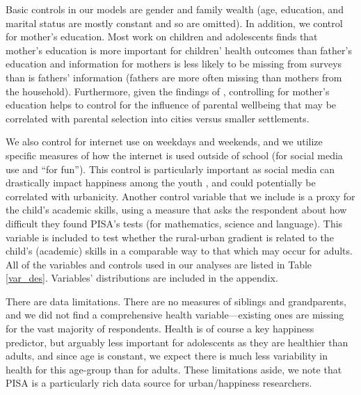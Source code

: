 \documentclass[11pt, letterpaper]{article}
\begin{document}
\begin{spacing}{1.9}
Basic controls in our models are gender and family wealth (age, education, and
marital status are mostly constant and so are omitted). In addition, we control
for mother's education. Most work on children and adolescents finds that
mother's education is more important for children' health outcomes than father's
education \citep{nepal2018matters} and information for mothers is less likely to
be missing from surveys than is fathers' information (fathers are more often
missing than mothers from the household). Furthermore, given the findings of \citet{morrison2024resolving}, controlling for mother's education helps to control for the influence of parental wellbeing that may be correlated with parental selection into cities versus smaller settlements.

We also control for internet use on weekdays and weekends, and we utilize  specific measures of how the
internet is used outside of school (for  social media use and ``for fun''). This control is particularly important as  social media can
drastically impact happiness among the youth
\citep{twengeATL17sep,twenge14}, and could potentially be correlated with
urbanicity.  Another control variable that we include is a proxy for the child's
academic skills, using a measure that asks the respondent about how difficult
they found PISA's tests (for mathematics, science and language). This variable
is included to test whether the rural-urban gradient is related to the child's
(academic) skills in a comparable way to that which  may occur for adults. All of the variables and controls used in our analyses are listed
in Table \ref{var_des}. Variables' distributions are included in the appendix.

There are data limitations. There are no measures of siblings
and grandparents, and we did not find a comprehensive health variable---existing ones are
missing for the vast majority of respondents. Health is of course a key
happiness predictor, but arguably less important for adolescents as they are
healthier than adults, and since age is constant, we expect there is much less variability in
health for this age-group than for adults. These limitations aside, we  note
that  PISA is a particularly rich data source  for urban/happiness researchers. %
 

\end{spacing}
\end{document}
